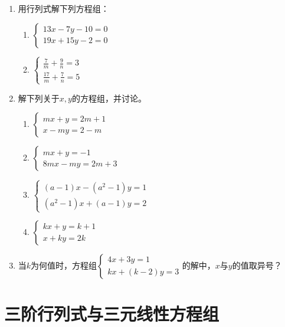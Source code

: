 \begin{enumerate}
\item 用行列式解下列方程组：
\begin{multicols}{2}
\begin{enumerate}
    \item $\begin{cases}
        13x-7y-10=0\\19x+15y-2=0
    \end{cases}$
    \item $\begin{cases}
        \frac{7}{m}+\frac{9}{n}=3\\
        \frac{17}{m}+\frac{7}{n}=5
    \end{cases}$
\end{enumerate}
\end{multicols}
\item 解下列关于$x,y$的方程组，并讨论。
\begin{multicols}{2}
\begin{enumerate}
    \item $\begin{cases}
        mx+y=2m+1\\x-my=2-m
    \end{cases}$
    \item $\begin{cases}
        mx+y=-1\\8mx-my=2m+3
    \end{cases}$
    \item $\begin{cases}
        (a-1)x-(a^2-1)y=1\\
        (a^2-1)x+(a-1)y=2
    \end{cases}$
    \item $\begin{cases}
        kx+y=k+1\\
        x+ky=2k
    \end{cases}$
\end{enumerate}    
\end{multicols}

\item 当$k$为何值时，方程组$\begin{cases}
    4x+3y=1\\kx+(k-2)y=3
\end{cases}$的解中，$x$与$y$的值取异号？
\end{enumerate}

\section{三阶行列式与三元线性方程组}
